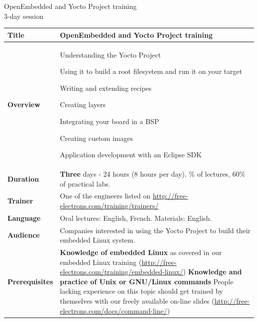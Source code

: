 \documentclass[a4paper,12pt,obeyspaces,spaces,hyphens]{article}
\begin{document}
\thispagestyle{fancy}

\setlength{\arrayrulewidth}{0.8pt}

\begin{center}
\LARGE
OpenEmbedded and Yocto Project training\\
\large
3-day session
\end{center}
\vspace{1cm}

\small
{}

 {
  \begin{tabularx}{\textwidth}{|g|h|}
    {\bf Title} & OpenEmbedded and Yocto Project training \\
    \hline

    {\bf Overview} &
    Understanding the Yocto Project \par
    Using it to build a root filesystem and run it on your target \par
    Writing and extending recipes \par
    Creating layers \par
    Integrating your board in a BSP \par
    Creating custom images \par
    Application development with an Eclipse SDK \\
    \hline

    {\bf Duration} & {\bf Three} days - 24 hours (8 hours per day).
    \% of lectures, 60\% of practical labs. \\
    \hline

    {\bf Trainer} & One of the engineers listed on
    \newline \url{http://free-electrons.com/training/trainers/}\\
    \hline

    {\bf Language} & Oral lectures: English, French.
    \newline Materials: English.\\
    \hline

    {\bf Audience} & Companies interested in using the Yocto Project to build their
    embedded Linux system.\\
    \hline

    {\bf Prerequisites} & {\bf Knowledge of embedded Linux} as covered
    in our embedded Linux training
    (\url{http://free-electrons.com/training/embedded-linux/}) \newline 
    {\bf Knowledge and practice of Unix or GNU/Linux commands}
    \newline People lacking experience on this topic should get
    trained by themselves with our freely available on-line slides
    (\url{http://free-electrons.com/docs/command-line/}) \\
    \hline


\end{tabularx}}
\end{document}
